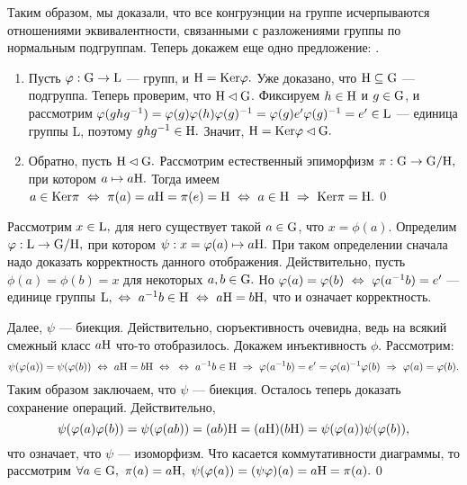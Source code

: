Таким образом, мы доказали, что все конгруэнции на группе исчерпываются отношениями эквивалентности, связанными с разложениями группы по нормальным подгруппам. Теперь
докажем еще одно предложение:
.
\par\dok \begin{enumerate}
    \item Пусть $\varphi : {\rm G}\rightarrow{\rm L}$ --- \gmm групп, и ${\rm H}={\rm Ker}\varphi.$ Уже доказано, что ${\rm H}\subseteq{\rm G}$ --- подгруппа. Теперь проверим, что
    ${\rm H}\lhd{\rm G}$. Фиксируем $h\in{\rm H}$ и $g\in{\rm G}$, и рассмотрим $\varphi(ghg^{-1})=\varphi(g)\varphi(h)\varphi(g)^{-1}=\varphi(g)e'\varphi(g)^{-1}=e'\in{\rm L}$ --- единица группы \rr L, поэтому
    $ghg^{-1}\in{\rm H}.$ Значит, ${\rm H}={\rm Ker}\varphi\lhd{\rm G}.$
    \item Обратно, пусть ${\rm H}\lhd{\rm G}.$ Рассмотрим естественный эпиморфизм $\pi : {\rm G}\rightarrow {\rm G}/{\rm H}, $ при котором $a\mapsto a{\rm H}.$
    Тогда имеем $a\in{\rm Ker}\pi\ \Leftrightarrow\ \pi(a)=a{\rm H}=\pi(e)={\rm H}\ \Leftrightarrow\  a\in{\rm H}\ \Rightarrow\ {\rm Ker}\pi={\rm H}.$\qquad\qed
\end{enumerate}

\dok Рассмотрим $x\in{\rm L},$ для него существует такой $a\in{\rm G}$, что $x=\phi(a).$ Определим $\varphi : {\rm L}\rightarrow {\rm G}/{\rm H},$ при котором $\psi : x=\varphi(a)\mapsto a{\rm H}.$
При таком определении сначала надо доказать корректность данного отображения. Действительно, пусть $\phi(a)=\phi(b)=x$ для некоторых $a,b\in{\rm G}.$
Но $\varphi(a)=\varphi(b)\ \Leftrightarrow\ \varphi(a^{-1}b)=e'$ --- единице группы ${\rm L},\ \Leftrightarrow\  a^{-1}b\in{\rm H}\ \Leftrightarrow\  a{\rm H}=b{\rm H},$ что и означает корректность.

Далее, $\psi$ --- биекция. Действительно, сюръективность очевидна, ведь на всякий смежный класс $a{\rm H}$ что-то отобразилось. Докажем инъективность $\phi$.
Рассмотрим: $$\psi(\varphi(a))=\psi(\varphi(b))\ \Leftrightarrow\  a{\rm H}=b{\rm H}\ \Leftrightarrow\ \\\ \Leftrightarrow\  a^{-1}b\in{\rm H}\ \Rightarrow\ \varphi(a^{-1}b)=e'=\varphi(a)^{-1}\varphi(b)\ \Rightarrow\  \varphi(a)=\varphi(b).$$
Таким образом заключаем, что $\psi$ --- биекция. Осталось теперь доказать сохранение операций. Действительно, $$\psi(\varphi(a)\varphi(b))=\psi(\varphi(ab))=(ab){\rm H}=(a{\rm H})(b{\rm H})=\psi(\varphi(a))\psi(\varphi(b)),$$
что означает, что $\psi$ --- изоморфизм. Что касается коммутативности диаграммы, то рассмотрим $\forall a\in\rr G,\ \pi(a)=a\rr H,\ \psi(\phi(a))=(\psi\phi)(a)=a\rr H=\pi(a).$\qquad\qed

